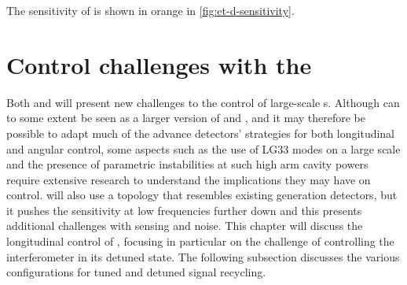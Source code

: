 The sensitivity of \ETHF{} is shown in orange in \cref{fig:et-d-sensitivity}.

\section{\label{sec:et-lf-control-challenges}Control challenges with the \ET{}}
Both \ETLF{} and \ETHF{} will present new challenges to the control of large-scale \DRFPMI{}s. Although \ETHF{} can to some extent be seen as a larger version of \ALIGO{} and \AVIRGO{}, and it may therefore be possible to adapt much of the advance detectors' strategies for both longitudinal and angular control, some aspects such as the use of LG33 modes on a large scale and the presence of parametric instabilities at such high arm cavity powers~\cite{Evans2015} require extensive research to understand the implications they may have on control. \ETLF{} will also use a topology that resembles existing generation detectors, but it pushes the sensitivity at low frequencies further down and this presents additional challenges with sensing and noise. This chapter will discuss the longitudinal control of \ETLF{}, focusing in particular on the challenge of controlling the interferometer in its detuned state. The following subsection discusses the various configurations for tuned and detuned signal recycling.

